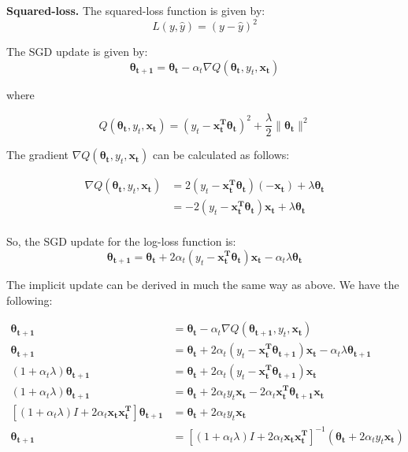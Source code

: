 \documentclass{article}
\renewcommand{\vec}[1]{\boldsymbol{#1}}
\begin{document}
\begin{enumerate}[(a)]
\textbf{Squared-loss.}
The squared-loss function is given by:
\begin{equation}
L(y, \hat{y}) = (y-\hat{y})^2
\end{equation}

The SGD update is given by:
\begin{equation}
\vec{\theta_{t+1}} = \vec{\theta_{t}} - \alpha_{t}\nabla Q(\vec{\theta_{t}}, y_t, \vec{x_t})
\end{equation}

where

\begin{equation}
Q(\vec{\theta_{t}}, y_t, \vec{x_t}) = \left(y_t - \vec{x_t^T}\vec{\theta_t}\right)^2 + \frac{\lambda}{2}\|\vec{\theta_t}\|^2
\end{equation}

The gradient $\nabla Q(\vec{\theta_{t}}, y_t, \vec{x_t})$ can be calculated as follows:

\begin{align*}
\nabla Q(\vec{\theta_{t}}, y_t, \vec{x_t}) &= 2\left(y_t - \vec{x_t^T}\vec{\theta_t}\right)\left(-\vec{x_t}\right) + \lambda\vec{\theta_t}\\
&= -2(y_t-\vec{x_t^T}\vec{\theta_t})\vec{x_t} + \lambda\vec{\theta_t}\\
\end{align*}

So, the SGD update for the log-loss function is:
\begin{equation}
\vec{\theta_{t+1}} = \vec{\theta_{t}} +2 \alpha_{t}\left( y_t-\vec{x_t^T}\vec{\theta_t} \right )\vec{x_t} - \alpha_t\lambda\vec{\theta_t}
\end{equation}

The implicit update can be derived in much the same way as above. We have the following:

\begin{align*}
\vec{\theta_{t+1}} &= \vec{\theta_t} - \alpha_t \nabla Q(\vec{\theta_{t+1}}, y_t, \vec{x_t})\\
\vec{\theta_{t+1}} &= \vec{\theta_{t}} +2 \alpha_{t}\left( y_t-\vec{x_t^T}\vec{\theta_{t+1}} \right )\vec{x_t} - \alpha_t\lambda\vec{\theta_{t+1}}\\
(1+\alpha_t\lambda)\vec{\theta_{t+1}} &= \vec{\theta_{t}} +2 \alpha_{t}\left( y_t-\vec{x_t^T}\vec{\theta_{t+1}} \right )\vec{x_t}\\
(1+\alpha_t\lambda)\vec{\theta_{t+1}} &= \vec{\theta_{t}} + 2\alpha_t y_t \vec{x_t} - 2\alpha_t\vec{x_t^T}\vec{\theta_{t+1}}\vec{x_t}\\
\left[(1+\alpha_t\lambda)I + 2\alpha_t\vec{x_t}\vec{x_t^T}\right]\vec{\theta_{t+1}} &= \vec{\theta_t} + 2\alpha_t y_t\vec{x_t}\\
\vec{\theta_{t+1}} &= \left[(1+\alpha_t\lambda)I + 2\alpha_t\vec{x_t}\vec{x_t^T}\right]^{-1}\left(\vec{\theta_t} + 2\alpha_t y_t \vec{x_t}\right)
\end{align*}


\end{enumerate}
\end{document}

